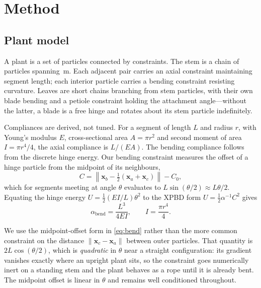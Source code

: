 \documentclass[conference]{IEEEtran}
\begin{document}
\section{Method}

\subsection{Plant model}

A plant is a set of particles connected by constraints. The stem is a chain of
\StemNodes{} particles spanning \StemLength{}\,m. Each adjacent pair carries an
axial constraint maintaining segment length; each interior particle carries a
bending constraint resisting curvature. Leaves are short chains branching from
stem particles, with their own blade bending and a petiole constraint holding
the attachment angle---without the latter, a blade is a free hinge and rotates
about its stem particle indefinitely.

Compliances are derived, not tuned. For a segment of length $L$ and radius
$r$, with Young's modulus $E$, cross-sectional area $A = \pi r^2$ and second
moment of area $I = \pi r^4 / 4$, the axial compliance is $L/(EA)$. The
bending compliance follows from the discrete hinge energy. Our bending
constraint measures the offset of a hinge particle from the midpoint of its
neighbours,
\begin{equation}
C = \left\lVert \mathbf{x}_b - \tfrac{1}{2}(\mathbf{x}_a + \mathbf{x}_c)
    \right\rVert - C_0 ,
\label{eq:bend}
\end{equation}
which for segments meeting at angle $\theta$ evaluates to
$L\sin(\theta/2) \approx L\theta/2$. Equating the hinge energy
$U = \tfrac{1}{2}(EI/L)\theta^2$ to the XPBD form
$U = \tfrac{1}{2}\alpha^{-1}C^2$ gives
\begin{equation}
\alpha_\text{bend} = \frac{L^3}{4EI}, \qquad I = \frac{\pi r^4}{4}.
\label{eq:compliance}
\end{equation}

We use the midpoint-offset form in \eqref{eq:bend} rather than the more common
constraint on the distance $\lVert \mathbf{x}_c - \mathbf{x}_a \rVert$ between
outer particles. That quantity is $2L\cos(\theta/2)$, which is
\emph{quadratic} in $\theta$ near a straight configuration: its gradient
vanishes exactly where an upright plant sits, so the constraint goes
numerically inert on a standing stem and the plant behaves as a rope until it
is already bent. The midpoint offset is linear in $\theta$ and remains well
conditioned throughout.
\end{document}
